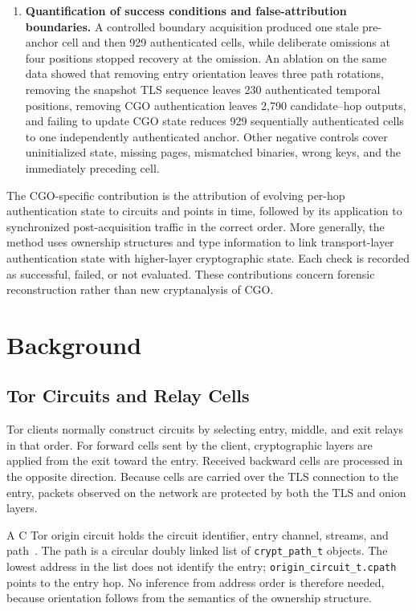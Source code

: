 \documentclass[10pt,a4paper]{article}
\newcommand{\code}[1]{\nolinkurl{#1}}
\begin{document}
\begin{enumerate}[label=\textbf{C\arabic*.},leftmargin=3em]
  \item \textbf{Quantification of success conditions and false-attribution boundaries.}
  A controlled boundary acquisition produced one stale pre-anchor cell and then 929 authenticated cells, while deliberate omissions at four positions stopped recovery at the omission. An ablation on the same data showed that removing entry orientation leaves three path rotations, removing the snapshot TLS sequence leaves 230 authenticated temporal positions, removing CGO authentication leaves 2,790 candidate--hop outputs, and failing to update CGO state reduces 929 sequentially authenticated cells to one independently authenticated anchor. Other negative controls cover uninitialized state, missing pages, mismatched binaries, wrong keys, and the immediately preceding cell.
\end{enumerate}

The CGO-specific contribution is the attribution of evolving per-hop authentication state to circuits and points in time, followed by its application to synchronized post-acquisition traffic in the correct order. More generally, the method uses ownership structures and type information to link transport-layer authentication state with higher-layer cryptographic state. Each check is recorded as successful, failed, or not evaluated. These contributions concern forensic reconstruction rather than new cryptanalysis of CGO.

\section{Background}\label{sec:background}

\subsection{Tor Circuits and Relay Cells}

Tor clients normally construct circuits by selecting entry, middle, and exit relays in that order.
For forward cells sent by the client, cryptographic layers are applied from the exit toward the entry. Received backward cells are processed in the opposite direction.
Because cells are carried over the TLS connection to the entry, packets observed on the network are protected by both the TLS and onion layers.

A C Tor origin circuit holds the circuit identifier, entry channel, streams, and path~\cite{ctorsource04916}.
The path is a circular doubly linked list of \code{crypt_path_t} objects.
The lowest address in the list does not identify the entry; \code{origin_circuit_t.cpath} points to the entry hop.
No inference from address order is therefore needed, because orientation follows from the semantics of the ownership structure.
\end{document}
